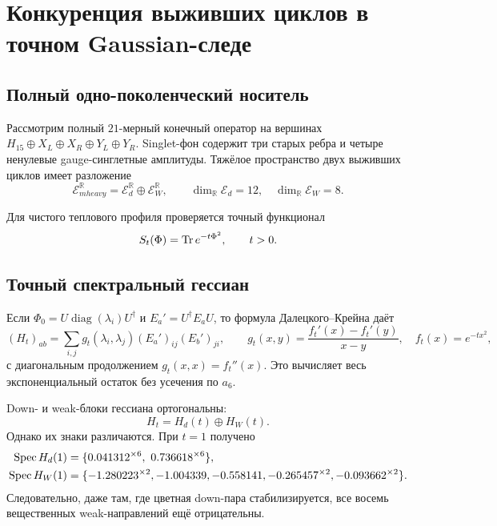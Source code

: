\chapter{Конкуренция выживших циклов в точном Gaussian-следе}
\label{ch:v7-weak-aligned-cycle-competition-gate}

\section{Полный одно-поколенческий носитель}

Рассмотрим полный $21$-мерный конечный оператор на вершинах
$H_{15}\oplus X_L\oplus X_R\oplus Y_L\oplus Y_R$. Singlet-фон содержит
три старых ребра и четыре ненулевые gauge-синглетные амплитуды. Тяжёлое
пространство двух выживших циклов имеет разложение
\begin{equation}
 \mathcal E_{
m heavy}^{\mathbb R}
 =\mathcal E_d^{\mathbb R}\oplus\mathcal E_W^{\mathbb R},
 \qquad \dim_{\mathbb R}\mathcal E_d=12,
 \quad \dim_{\mathbb R}\mathcal E_W=8.
 \label{eq:v7-weak-competition-heavy-split}
\end{equation}

Для чистого теплового профиля проверяется точный функционал
\begin{equation}
 S_t(\Phi)=\operatorname{Tr} e^{-t\Phi^2},\qquad t>0.
 \label{eq:v7-weak-competition-exact-gaussian}
\end{equation}

\section{Точный спектральный гессиан}

Если $\Phi_0=U\operatorname{diag}(\lambda_i)U^\dagger$ и
$E_a'=U^\dagger E_aU$, то формула Далецкого--Крейна даёт
\begin{equation}
 (H_t)_{ab}=\sum_{i,j}g_t(\lambda_i,\lambda_j)
 (E_a')_{ij}(E_b')_{ji},
 \qquad
 g_t(x,y)=\frac{f_t'(x)-f_t'(y)}{x-y},
 \quad f_t(x)=e^{-tx^2},
 \label{eq:v7-weak-competition-divided-hessian}
\end{equation}
с диагональным продолжением $g_t(x,x)=f_t''(x)$. Это вычисляет весь
экспоненциальный остаток без усечения по $a_6$.

Down- и weak-блоки гессиана ортогональны:
\begin{equation}
 H_t=H_d(t)\oplus H_W(t).
 \label{eq:v7-weak-competition-block-split}
\end{equation}
Однако их знаки различаются. При $t=1$ получено
\begin{align}
 \Spec H_d(1)&=\{0.041312^{\times6},\ 0.736618^{\times6}\},\nonumber\\
 \Spec H_W(1)&=\{-1.280223^{\times2},-1.004339,-0.558141,
 -0.265457^{\times2},-0.093662^{\times2}\}.
 \label{eq:v7-weak-competition-t-one-spectrum}
\end{align}
Следовательно, даже там, где цветная down-пара стабилизируется, все восемь
вещественных weak-направлений ещё отрицательны.


